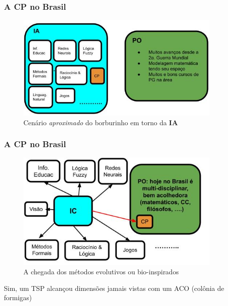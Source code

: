 \documentclass{beamer}
\begin{document}
\begin{frame}[fragile]
\frametitle{A CP no Brasil}

\begin{figure}[!ht]
\begin{center}
\includegraphics[width=0.90\textwidth, height=0.65\textheight]{figures/ia_brasil_90.jpg}
\caption{Cenário {\em aproximado} do borburinho em torno da {\bf IA}}
\end{center}
\end{figure}

\end{frame}
\begin{frame}[fragile]
\frametitle{A CP no Brasil}

\begin{figure}[!ht]
\begin{center}
\includegraphics[width=0.90\textwidth, height=0.65\textheight]{figures/ia_brasil_2020.jpg}
\caption{A chegada dos métodos evolutivos ou bio-inspirados}
\end{center}
\end{figure}
\pause
Sim, um TSP  alcançou dimensões jamais vistas com um ACO (colônia de formigas)
\end{frame}
\end{document}
